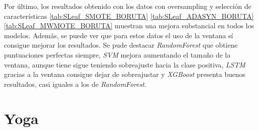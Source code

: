 Por último, los resultados obtenido con los datos con oversampling y selección de características \ref{tab:SLeaf_SMOTE_BORUTA} \ref{tab:SLeaf_ADASYN_BORUTA} \ref{tab:SLeaf_MWMOTE_BORUTA} muestran una mejora substancial en todos los modelos. Además, se puede ver que para estos datos el uso de la ventana sí consigue mejorar los resultados. Se pude destacar \textit{RandomForest} que obtiene puntuaciones perfectas siempre, \textit{SVM} mejora aumentando el tamaño de la ventana, aunque tiene sigue teniendo sobreajuste hacia la clase positiva, \textit{LSTM} gracias a la ventana consigue dejar de sobreajustar y \textit{XGBoost} presenta buenos resultados, casi iguales a los de \textit{RandomForest}.

\section{Yoga}
